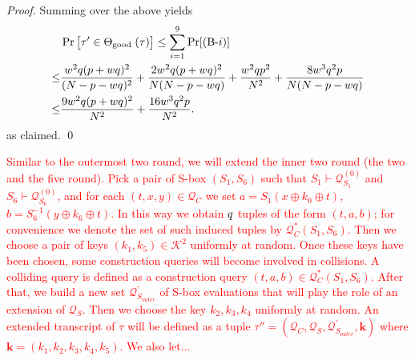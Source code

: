 \begin{proof}
	
	\arrangespace
	
	
	Summing over the above yields
	\begin{align*}
	&  \Pr\big[ \tau' \in \Theta_{\text {good }}(\tau)\big]  \leq \sum_{i=1}^{9}\Pr[\text{(B-}i)]       \\
	\leq  & \frac{w^2 q (p+w q)^{2}}{(N-p-wq)^{2}}+
	\frac{2w^2 q (p+w q)^{2}}{N  (N-p-wq)}+
	\frac{w^2qp^2}{N^2}+
	\frac{8w^3q^2p}{N(N-p-wq)}      \\
	\leq  & \frac{9w^2 q (p+w q)^{2}}{N^2}+ \frac{16w^3q^2p}{N^2} .
	\end{align*}
	as claimed.        \qed
\end{proof}



\textcolor{red}{Similar to the outermost two round, we will extend the inner two round (the two and the five round).  Pick a pair of S-box $(S_1, S_6)$ such that $S_{1} \vdash \mathcal{Q}_{S_{1}}^{(0)}$ and $S_{6} \vdash \mathcal{Q}_{S_{6}}^{(0)}$, and for each $ (t, x, y) \in \mathcal{Q}_{C}$ we set $a=S_{1}\left(x \oplus k_{0} \oplus t\right)$, $b=S_{6}^{-1}\left(y \oplus k_{6} \oplus t\right)$. In this way we obtain $\mathnormal{q}$ tuples of the form $(t, a, b)$; for convenience we denote the set of such induced tuples by $\mathcal{Q}_{C}^{*}\left(S_{1}, S_{6}\right)$. Then we choose a pair of keys $\left(k_{1}, k_{5}\right) \in \mathcal{K}^{2}$ uniformly at random. Once these keys have been chosen, some construction queries will become involved in collisions. A colliding query is defined as a construction query $(t, a, b) \in \mathcal{Q}_{C}^{*}\left(S_{1}, S_{6}\right)$. After that, we build a new set $\mathcal{Q}_{S_{outer}}^{\prime}$ of S-box evaluations that will play the role of an extension of $\mathcal{Q}_{S}$. Then we choose the key $k_2, k_3, k_4$ uniformly at random. An extended transcript of $\tau$ will be defined as a tuple $\tau''=\left(\mathcal{Q}_{C}, \mathcal{Q}_{S}, \mathcal{Q}_{S_{outer}}^{\prime}, \mathbf{k}\right)$ where $\mathbf{k}=\left(k_{1}, k_{2},k_{3},k_{4}, k_{5}\right)$. We also let...}

